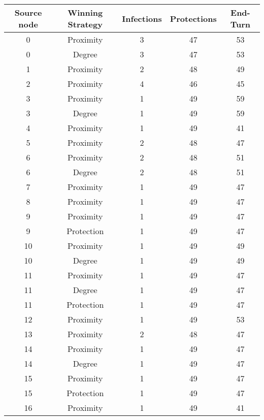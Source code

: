 \documentclass[results.tex]{subfiles}
\begin{document}
\begin{center}
  \begin{tabular}{| c || c | c | c | c |}
    \hline
    {\bfseries Source node} & {\bfseries Winning Strategy} & {\bfseries Infections} & {\bfseries Protections} & {\bfseries End-Turn} \\  %
    \hline\hline
    0 & Proximity & 3 & 47 & 53 \\ 
    \hline
    0 & Degree & 3 & 47 & 53 \\ 
    \hline
    1 & Proximity & 2 & 48 & 49 \\ 
    \hline
    2 & Proximity & 4 & 46 & 45 \\ 
    \hline
    3 & Proximity & 1 & 49 & 59 \\ 
    \hline
    3 & Degree & 1 & 49 & 59 \\ 
    \hline
    4 & Proximity & 1 & 49 & 41 \\ 
    \hline
    5 & Proximity & 2 & 48 & 47 \\ 
    \hline
    6 & Proximity & 2 & 48 & 51 \\ 
    \hline
    6 & Degree & 2 & 48 & 51 \\ 
    \hline
    7 & Proximity & 1 & 49 & 47 \\ 
    \hline
    8 & Proximity & 1 & 49 & 47 \\ 
    \hline
    9 & Proximity & 1 & 49 & 47 \\ 
    \hline
    9 & Protection & 1 & 49 & 47 \\ 
    \hline
    10 & Proximity & 1 & 49 & 49 \\ 
    \hline
    10 & Degree & 1 & 49 & 49 \\ 
    \hline
    11 & Proximity & 1 & 49 & 47 \\ 
    \hline
    11 & Degree & 1 & 49 & 47 \\ 
    \hline
    11 & Protection & 1 & 49 & 47 \\ 
    \hline
    12 & Proximity & 1 & 49 & 53 \\ 
    \hline
    13 & Proximity & 2 & 48 & 47 \\ 
    \hline
    14 & Proximity & 1 & 49 & 47 \\ 
    \hline
    14 & Degree & 1 & 49 & 47 \\ 
    \hline
    15 & Proximity & 1 & 49 & 47 \\ 
    \hline
    15 & Protection & 1 & 49 & 47 \\ 
    \hline
    16 & Proximity & 1 & 49 & 41 \\ 
    \hline

\end{tabular}
\end{center}
\end{document}
